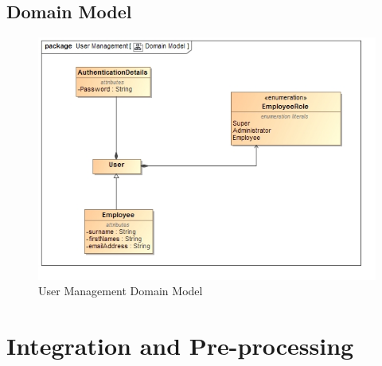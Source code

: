 \documentclass[11pt,a4paper]{article}
\begin{document}
\subsection{Domain Model}
\begin{figure}[H]
	\begin{center}
		\includegraphics[scale=0.75]{../Images/User_Domain.jpg}
		\caption{User Management Domain Model}
	\end{center}
\end{figure}

\pagebreak

\section{Integration and Pre-processing}
\end{document}

